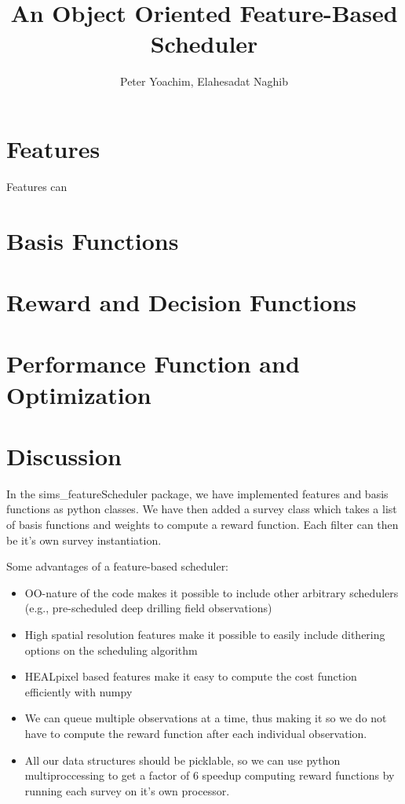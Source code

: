 \documentclass[12pt,preprint]{aastex}
\begin{document}
\title{An Object Oriented Feature-Based Scheduler}


\author{Peter Yoachim, Elahesadat Naghib}

\section{Features}
Features can 

\section{Basis Functions}



\section{Reward and Decision Functions}


\section{Performance Function and Optimization}

\section{Discussion}
In the sims_featureScheduler package, we have implemented features and basis functions as python classes. We have then added a survey class which takes a list of basis functions and weights to compute a reward function. Each filter can then be it's own survey instantiation.

Some advantages of a feature-based scheduler:
\begin{itemize}
    \item{OO-nature of the code makes it possible to include other arbitrary schedulers (e.g., pre-scheduled deep drilling field observations)}
    \item{High spatial resolution features make it possible to easily include dithering options on the scheduling algorithm}
    \item{HEALpixel based features make it easy to compute the cost function efficiently with numpy}
    \item{We can queue multiple observations at a time, thus making it so we do not have to compute the reward function after each individual observation.}
    \item{All our data structures should be picklable, so we can use python multiproccessing to get a factor of 6 speedup computing reward functions by running each survey on it's own processor.}
\end{itemize}




\end{document}
